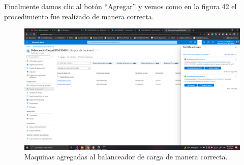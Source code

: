 \documentclass[11pt]{article}
\begin{document}
			Finalmente damos clic al botón ``Agregar'' y vemos como en la figura 42 el procedimiento fue realizado de manera correcta.
			\begin{figure}[H]
				\centering
				\includegraphics[scale=0.34]{resources/configBalanceadorF.png}
				\caption{Maquinas agregadas al balanceador de carga de manera correcta.}\label{fig:picture}
			\end{figure}
\end{document}
